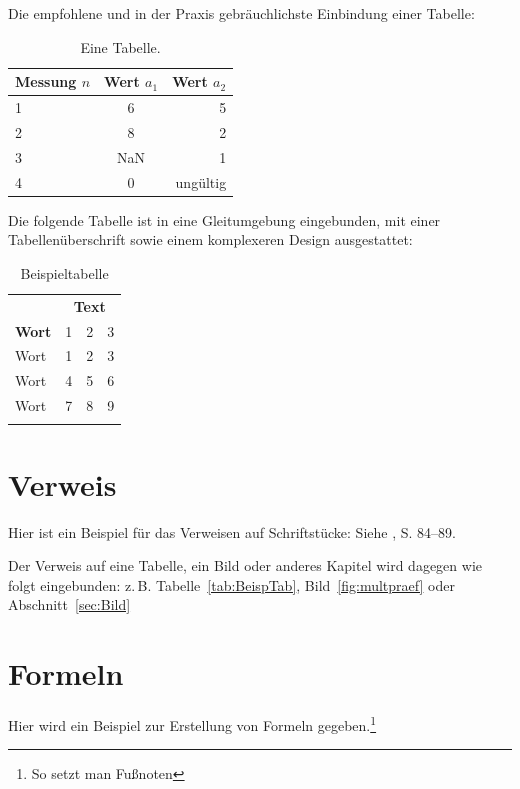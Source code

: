 \noindent Die empfohlene und in der Praxis gebräuchlichste Einbindung einer Tabelle: 
\begin{table}[htbp]
	\centering
	\begin{tabular}{lcr}
		\toprule
		Messung $n$ & Wert $a_1$ & Wert $a_2$\\
		\midrule
		1 & 6 & 5\\
		\midrule
		2 & 8 & 2\\
		\midrule
		3 & NaN & 1\\
		\midrule
		4 & 0 & ungültig \\
		\bottomrule
	\end{tabular}
	\caption{Eine Tabelle.} \label{tab:EineTabelle}
\end{table}
\medskip %

\noindent Die folgende Tabelle ist in eine Gleitumgebung eingebunden, mit einer Tabellenüberschrift sowie einem komplexeren Design ausgestattet:
\begin{center}
{\footnotesize %
	\begin{longtable}{lrrr}
	\caption[Beispieltabelle]{Beispieltabelle}\\
	\toprule
	 & \multicolumn{3}{c}{\textbf{Text}}\\ 
	\cmidrule(r){2-4}
	\textbf{Wort} & 1 & 2 & 3 \\ 
	\midrule
	\endhead
	Wort & 1 & 2 & 3\\ 
	Wort & 4 & 5 & 6 \\ 
	Wort& 7 & 8 & 9 \\ 
	\bottomrule
	\endlastfoot
	\end{longtable} \label{tab:BeispTab}
}
\end{center}


\section{Verweis}
\label{sec:Verweis}
Hier ist ein Beispiel für das Verweisen auf Schriftstücke:
Siehe \cite{einbuch}, S. 84--89.

Der Verweis auf eine Tabelle, ein Bild oder anderes Kapitel wird dagegen wie folgt eingebunden: z.\,B. Tabelle~\ref{tab:BeispTab}, Bild~\ref{fig:multpraef} oder Abschnitt~\ref{sec:Bild}

\section{Formeln}
\label{sec:Formeln}
Hier wird ein Beispiel zur Erstellung von Formeln gegeben.\footnote{So setzt man Fußnoten}

